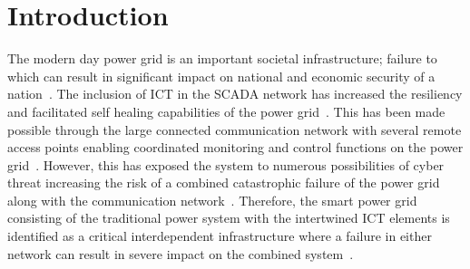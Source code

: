 \section{Introduction}\label{sec:intro}
The modern day power grid is an important societal infrastructure; failure to which can result in significant impact on national and economic security of a nation~\cite{NAP,ref1,raissa_2012}. The inclusion of ICT in the SCADA network has increased the resiliency and facilitated self healing capabilities of the power grid~\cite{alex2012}. This has been made possible through the large connected communication network with several remote access points enabling coordinated monitoring and control functions on the power grid~\cite{smart2005}. However, this has exposed the system to numerous possibilities of cyber threat increasing the risk of a combined catastrophic failure of the power grid along with the communication network~\cite{cigre2007}. Therefore, the smart power grid consisting of the traditional power system with the intertwined ICT elements is identified as a critical interdependent infrastructure where a failure in either network can result in severe impact on the combined system~\cite{stanley_2018}. 

